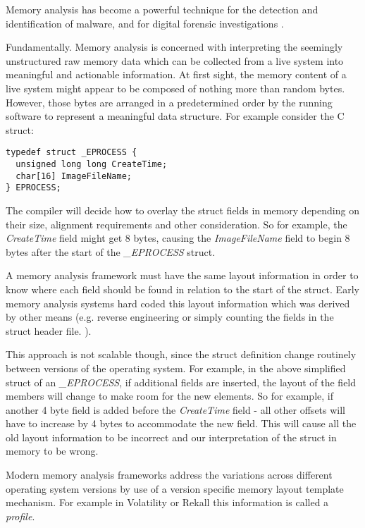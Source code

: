 Memory analysis has become a powerful technique for the detection and
identification of malware, and for digital forensic investigations
\citep{ligh2010malware,Ligh:2014:AMF:2621971}.

Fundamentally. Memory analysis is concerned with interpreting the seemingly
unstructured raw memory data which can be collected from a live system into
meaningful and actionable information. At first sight, the memory content of a
live system might appear to be composed of nothing more than random
bytes. However, those bytes are arranged in a predetermined order by the running
software to represent a meaningful data structure. For example consider the C
struct:

\begin{lstlisting}
typedef struct _EPROCESS {
  unsigned long long CreateTime;
  char[16] ImageFileName;
} EPROCESS;

\end{lstlisting}


The compiler will decide how to overlay the struct fields in memory depending on
their size, alignment requirements and other consideration. So for example, the
{\em CreateTime} field might get 8 bytes, causing the {\em ImageFileName} field to
begin 8 bytes after the start of the {\em \_EPROCESS} struct.

A memory analysis framework must have the same layout information in order to
know where each field should be found in relation to the start of the
struct. Early memory analysis systems hard coded this layout information which
was derived by other means (e.g. reverse engineering or simply counting the
fields in the struct header file. \citep{schuster2007ptfinder}).

This approach is not scalable though, since the struct definition change
routinely between versions of the operating system. For example, in the above
simplified struct of an {\em \_EPROCESS}, if additional fields are inserted, the
layout of the field members will change to make room for the new elements. So
for example, if another 4 byte field is added before the {\em CreateTime} field
- all other offsets will have to increase by 4 bytes to accommodate the new
field. This will cause all the old layout information to be incorrect and our
interpretation of the struct in memory to be wrong.

Modern memory analysis frameworks address the variations across different
operating system versions by use of a version specific memory layout template
mechanism. For example in Volatility \citep{volatility} or Rekall \citep{rekall}
this information is called a {\em profile}.

